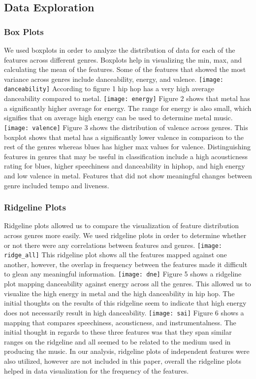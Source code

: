 \documentclass[11pt, a4paper, twocolumn]{article}
\begin{document}
\subsection{Data Exploration}
\subsubsection{Box Plots}
We used boxplots in order to analyze the distribution of data for each of the features across different genres. Boxplots help in visualizing the min, max, and calculating the mean of the features. Some of the features that showed the most variance across genres include danceability, energy, and valence.  
\texttt{[image: danceability]}
According to figure 1 hip hop has a very high average danceability compared to metal. 
\texttt{[image: energy]}
Figure 2 shows that metal has a significantly higher average for energy. The range for energy is also small, which signifies that on average high energy can be used to determine metal music.
\texttt{[image: valence]}
Figure 3 shows the distribution of valence across genres. This boxplot shows that metal has a significantly lower valence in comparison to the rest of the genres whereas blues has higher max values for valence. 
Distinguishing features in genres that may be useful in classification include a high acousticness rating for blues, higher speechiness and danceability in hiphop, and high energy and low valence in metal. Features that did not show meaningful changes between genre included tempo and liveness.  
\subsubsection{Ridgeline Plots}
Ridgeline plots allowed us to compare the visualization of feature distribution across genres more easily. We used ridgeline plots in order to determine whether or not there were any correlations between features and genres. 
\texttt{[image: ridge\_all]}
This ridgeline plot shows all the features mapped against one another, however, the overlap in frequency between the features made it difficult to glean any meaningful information. 
\texttt{[image: dne]}
Figure 5 shows a ridgeline plot mapping danceability against energy across all the genres. This allowed us to visualize the high energy in metal and the high danceability in hip hop. The initial thoughts on the results of this ridgeline seem to indicate that high energy does not necessarily result in high danceability. 
\texttt{[image: sai]}
Figure 6 shows a mapping that compares speechiness, acousticness, and instrumentalness. The initial thought in regards to these three features was that they span similar ranges on the ridgeline and all seemed to be related to the medium used in producing the music. In our analysis, ridgeline plots of independent features were also utilized, however are not included in this paper, overall the ridgeline plots helped in data visualization for the frequency of the features. 
\end{document}
